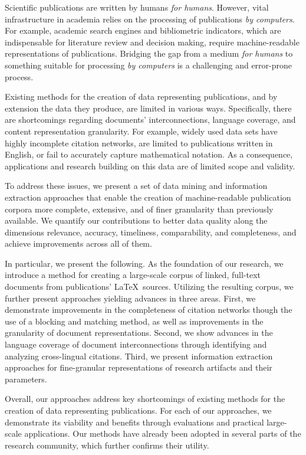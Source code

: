 \Abstract{}
Scientific publications are written by humans \emph{for humans}.
However, vital infrastructure in academia relies on the processing of publications \emph{by computers}.
For example, academic search engines and bibliometric indicators, which are indispensable for literature review and decision making, require machine-readable representations of publications.
Bridging the gap from a medium \emph{for humans} to something suitable for processing \emph{by computers} is a challenging and error-prone process.

Existing methods for the creation of data representing publications, and by extension the data they produce, are limited in various ways. Specifically, there are shortcomings regarding documents' interconnections, language coverage, and content representation granularity. For example, widely used data sets have highly incomplete citation networks, are limited to publications written in English, or fail to accurately capture mathematical notation. As a consequence, applications and research building on this data are of limited scope and validity.

To address these issues, we present a set of data mining and information extraction approaches that enable the creation of machine-readable publication corpora more complete, extensive, and of finer granularity than previously available. We quantify our contributions to better data quality along the dimensions relevance, accuracy, timeliness, comparability, and completeness, and achieve improvements across all of them.

In particular, we present the following.
As the foundation of our research, we introduce a method for creating a large-scale corpus of linked, full-text documents from publications' \LaTeX\ sources.
Utilizing the resulting corpus, we further present approaches yielding advances in three areas.
First, we demonstrate improvements in the completeness of citation networks though the use of a blocking and matching method, as well as improvements in the granularity of document representations.
Second, we show advances in the language coverage of document interconnections through identifying and analyzing cross-lingual citations.
Third, we present information extraction approaches for fine-granular representations of research artifacts and their parameters.

Overall, our approaches address key shortcomings of existing methods for the creation of data representing publications.
For each of our approaches, we demonstrate its viability and benefits through evaluations and practical large-scale applications.
Our methods have already been adopted in several parts of the research community, which further confirms their utility.
